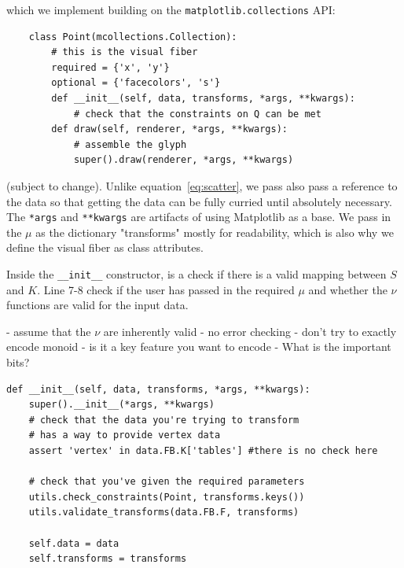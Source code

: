 \documentclass[../main.tex]{subfiles}
\begin{document}
which we implement building on the \texttt{matplotlib.collections} API:

\begin{verbatim}
    class Point(mcollections.Collection):
        # this is the visual fiber 
        required = {'x', 'y'}
        optional = {'facecolors', 's'} 
        def __init__(self, data, transforms, *args, **kwargs):
            # check that the constraints on Q can be met  
        def draw(self, renderer, *args, **kwargs):
            # assemble the glyph
            super().draw(renderer, *args, **kwargs)
    \end{verbatim}
    
(subject to change). Unlike equation~\ref{eq:scatter}, we pass also pass a reference to the data so that getting the data can be fully curried until absolutely necessary. The \texttt{*args} and \texttt{**kwargs} are artifacts of using Matplotlib as a base. We pass in the $\mu$ as the dictionary "transforms" mostly for readability, which is also why we define the visual fiber as class attributes.

Inside the \texttt{__init__} constructor, is a check if there is a valid mapping between $S$ and $K$.  Line 7-8 check if the user has passed in the required $\mu$ and whether the $\nu$ functions are valid for the input data.

- assume that the $\nu$ are inherently valid - no error checking
- don't try to exactly encode monoid - is it a key feature you want to encode
- What is the important bits? 

\begin{verbatim}
def __init__(self, data, transforms, *args, **kwargs):
    super().__init__(*args, **kwargs)
    # check that the data you're trying to transform 
    # has a way to provide vertex data  
    assert 'vertex' in data.FB.K['tables'] #there is no check here
    
    # check that you've given the required parameters
    utils.check_constraints(Point, transforms.keys())
    utils.validate_transforms(data.FB.F, transforms)

    self.data = data
    self.transforms = transforms
\end{verbatim}
\end{document}
